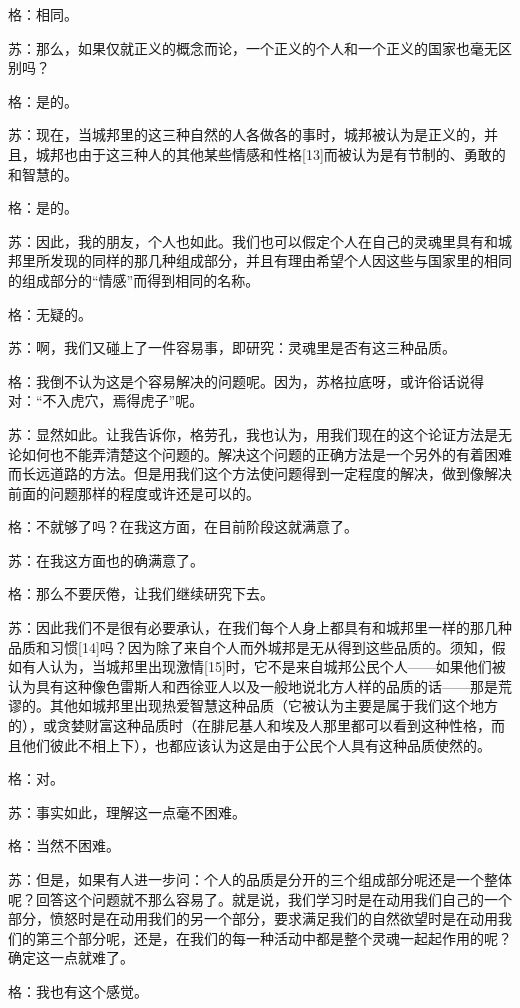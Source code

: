 \documentclass[12pt,oneside]{book}
\begin{document}
格：相同。

苏：那么，如果仅就正义的概念而论，一个正义的个人和一个正义的国家也毫无区别吗？

格：是的。

苏：现在，当城邦里的这三种自然的人各做各的事时，城邦被认为是正义的，并且，城邦也由于这三种人的其他某些情感和性格[13]而被认为是有节制的、勇敢的和智慧的。

格：是的。

苏：因此，我的朋友，个人也如此。我们也可以假定个人在自己的灵魂里具有和城邦里所发现的同样的那几种组成部分，并且有理由希望个人因这些与国家里的相同的组成部分的“情感”而得到相同的名称。

格：无疑的。

苏：啊，我们又碰上了一件容易事，即研究：灵魂里是否有这三种品质。

格：我倒不认为这是个容易解决的问题呢。因为，苏格拉底呀，或许俗话说得对：“不入虎穴，焉得虎子”呢。

苏：显然如此。让我告诉你，格劳孔，我也认为，用我们现在的这个论证方法是无论如何也不能弄清楚这个问题的。解决这个问题的正确方法是一个另外的有着困难而长远道路的方法。但是用我们这个方法使问题得到一定程度的解决，做到像解决前面的问题那样的程度或许还是可以的。

格：不就够了吗？在我这方面，在目前阶段这就满意了。

苏：在我这方面也的确满意了。

格：那么不要厌倦，让我们继续研究下去。

苏：因此我们不是很有必要承认，在我们每个人身上都具有和城邦里一样的那几种品质和习惯[14]吗？因为除了来自个人而外城邦是无从得到这些品质的。须知，假如有人认为，当城邦里出现激情[15]时，它不是来自城邦公民个人——如果他们被认为具有这种像色雷斯人和西徐亚人以及一般地说北方人样的品质的话——那是荒谬的。其他如城邦里出现热爱智慧这种品质（它被认为主要是属于我们这个地方的），或贪婪财富这种品质时（在腓尼基人和埃及人那里都可以看到这种性格，而且他们彼此不相上下），也都应该认为这是由于公民个人具有这种品质使然的。

格：对。

苏：事实如此，理解这一点毫不困难。

格：当然不困难。

苏：但是，如果有人进一步问：个人的品质是分开的三个组成部分呢还是一个整体呢？回答这个问题就不那么容易了。就是说，我们学习时是在动用我们自己的一个部分，愤怒时是在动用我们的另一个部分，要求满足我们的自然欲望时是在动用我们的第三个部分呢，还是，在我们的每一种活动中都是整个灵魂一起起作用的呢？确定这一点就难了。

格：我也有这个感觉。
\end{document}
